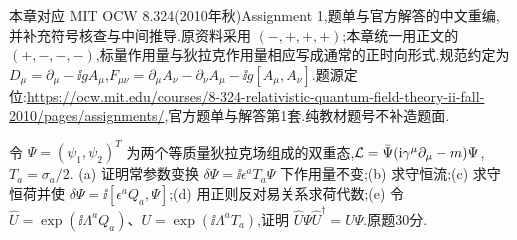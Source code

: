 本章对应 MIT OCW 8.324(2010年秋)Assignment 1,题单与官方解答的中文重编,并补充符号核查与中间推导.原资料采用 $(-,+,+,+)$;本章统一用正文的 $(+,-,-,-)$,标量作用量与狄拉克作用量相应写成通常的正时向形式.规范约定为 $D_\mu=\partial_\mu-\ii gA_\mu$,$F_{\mu\nu}=\partial_\mu A_\nu-\partial_\nu A_\mu-\ii g[A_\mu,A_\nu]$.题源定位:\url{https://ocw.mit.edu/courses/8-324-relativistic-quantum-field-theory-ii-fall-2010/pages/assignments/},官方题单与解答第1套.纯教材题号不补造题面.

\begin{exercise}
令 $\Psi=(\psi_1,\psi_2)^T$ 为两个等质量狄拉克场组成的双重态,$\mathcal L=\bar\Psi(\mathrm i\gamma^\mu\partial_\mu-m)\Psi$,$T_a=\sigma_a/2$.
(a) 证明常参数变换 $\delta\Psi=\ii\epsilon^aT_a\Psi$ 下作用量不变;(b) 求守恒流;(c) 求守恒荷并使 $\delta\Psi=\ii[\epsilon^aQ_a,\Psi]$;(d) 用正则反对易关系求荷代数;(e) 令 $\widehat U=\exp(\ii\Lambda^aQ_a)$、$U=\exp(\ii\Lambda^aT_a)$,证明 $\widehat U\Psi\widehat U^\dagger=U\Psi$.原题30分.
\end{exercise}
